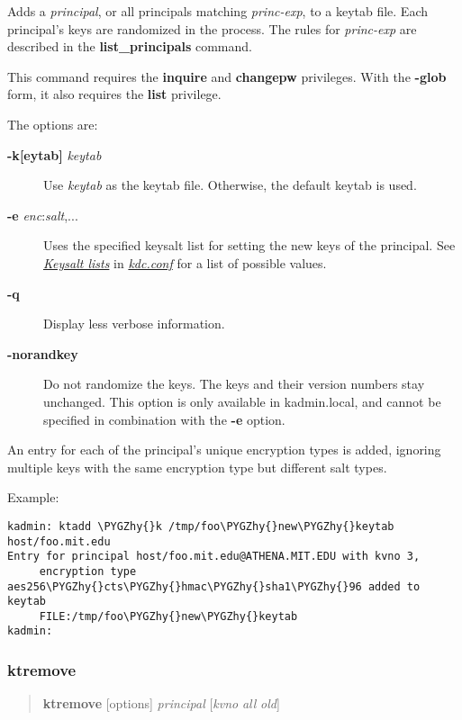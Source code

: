 \documentclass[letterpaper,10pt,english]{sphinxmanual}
\def\PYGZhy{\char`\-}
\begin{document}
Adds a \emph{principal}, or all principals matching \emph{princ-exp}, to a
keytab file.  Each principal's keys are randomized in the process.
The rules for \emph{princ-exp} are described in the \textbf{list\_principals}
command.

This command requires the \textbf{inquire} and \textbf{changepw} privileges.
With the \textbf{-glob} form, it also requires the \textbf{list} privilege.

The options are:
\begin{description}
\item[{\textbf{-k{[}eytab{]}} \emph{keytab}}] \leavevmode
Use \emph{keytab} as the keytab file.  Otherwise, the default keytab is
used.

\item[{\textbf{-e} \emph{enc}:\emph{salt},...}] \leavevmode
Uses the specified keysalt list for setting the new keys of the
principal.  See {\hyperref[admin/conf_files/kdc_conf:keysalt-lists]{\emph{Keysalt lists}}} in {\hyperref[admin/conf_files/kdc_conf:kdc-conf-5]{\emph{kdc.conf}}} for a
list of possible values.

\item[{\textbf{-q}}] \leavevmode
Display less verbose information.

\item[{\textbf{-norandkey}}] \leavevmode
Do not randomize the keys. The keys and their version numbers stay
unchanged.  This option is only available in kadmin.local, and
cannot be specified in combination with the \textbf{-e} option.

\end{description}

An entry for each of the principal's unique encryption types is added,
ignoring multiple keys with the same encryption type but different
salt types.

Example:

\begin{Verbatim}[commandchars=\\\{\}]
kadmin: ktadd \PYGZhy{}k /tmp/foo\PYGZhy{}new\PYGZhy{}keytab host/foo.mit.edu
Entry for principal host/foo.mit.edu@ATHENA.MIT.EDU with kvno 3,
     encryption type aes256\PYGZhy{}cts\PYGZhy{}hmac\PYGZhy{}sha1\PYGZhy{}96 added to keytab
     FILE:/tmp/foo\PYGZhy{}new\PYGZhy{}keytab
kadmin:
\end{Verbatim}
\label{admin/admin_commands/kadmin_local:ktadd-end}

\subsubsection{ktremove}
\label{admin/admin_commands/kadmin_local:id18}\label{admin/admin_commands/kadmin_local:ktremove}\label{admin/admin_commands/kadmin_local:ktadd-end}\begin{quote}

\textbf{ktremove} {[}options{]} \emph{principal} {[}\emph{kvno} \textbar{} \emph{all} \textbar{} \emph{old}{]}
\end{quote}
\end{document}

